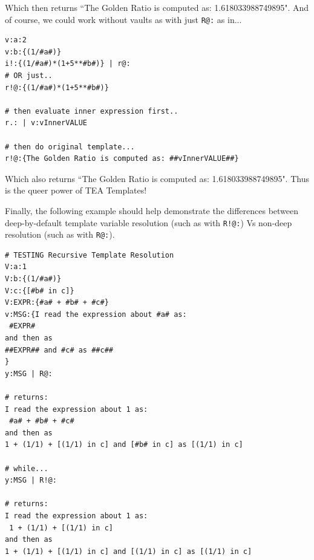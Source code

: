 \documentclass[a4paper, 18pt]{book} %
\begin{document}
{{{Which then returns ``The Golden Ratio is computed as: 1.618033988749895". And of course, we could work without vaults as with just \texttt{R@:} as in...


\vspace{2em}

  \begin{tcolorbox}[teaterminalstyle, title=R: EXAMPLE 12: Using R!@:, breakable]
  \begin{lstlisting}[language=TEA,breaklines=true,]
v:a:2
v:b:{(1/#a#)}
i!:{(1/#a#)*(1+5**#b#)} | r@:
# OR just..
r!@:{(1/#a#)*(1+5**#b#)} 

# then evaluate inner expression first..
r.: | v:vInnerVALUE

# then do original template...
r!@:{The Golden Ratio is computed as: ##vInnerVALUE##}
   \end{lstlisting}
  \end{tcolorbox}

\vspace{1em}

Which also returns ``The Golden Ratio is computed as: 1.618033988749895". Thus is the queer power of TEA Templates!

\vspace{2em}

Finally, the following example should help demonstrate the differences between deep-by-default template variable resolution (such as with \texttt{R!@:}) Vs non-deep resolution (such as with \texttt{R@:}).

\vspace{2em}

  \begin{tcolorbox}[teaterminalstyle, title=R: EXAMPLE 13: Using R@: Vs R!@:, breakable]
  \begin{lstlisting}[language=TEA,breaklines=true,]
# TESTING Recursive Template Resolution
V:a:1
V:b:{(1/#a#)}
V:c:{[#b# in c]} 
V:EXPR:{#a# + #b# + #c#}
v:MSG:{I read the expression about #a# as:
 #EXPR#
and then as 
##EXPR## and #c# as ##c##
}
y:MSG | R@:

# returns:
I read the expression about 1 as:
 #a# + #b# + #c#
and then as 
1 + (1/1) + [(1/1) in c] and [#b# in c] as [(1/1) in c]

# while...
y:MSG | R!@:

# returns:
I read the expression about 1 as:
 1 + (1/1) + [(1/1) in c]
and then as 
1 + (1/1) + [(1/1) in c] and [(1/1) in c] as [(1/1) in c]
   \end{lstlisting}
  \end{tcolorbox}

}}}
\end{document}
